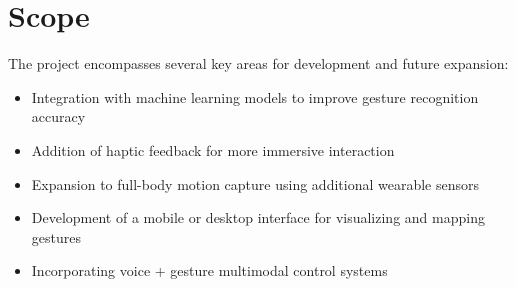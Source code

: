 \section{Scope}
The project encompasses several key areas for development and future expansion:
\begin{itemize}
    \item Integration with machine learning models to improve gesture recognition accuracy
    \item Addition of haptic feedback for more immersive interaction
    \item Expansion to full-body motion capture using additional wearable sensors
    \item Development of a mobile or desktop interface for visualizing and mapping gestures
    \item Incorporating voice + gesture multimodal control systems
\end{itemize}
